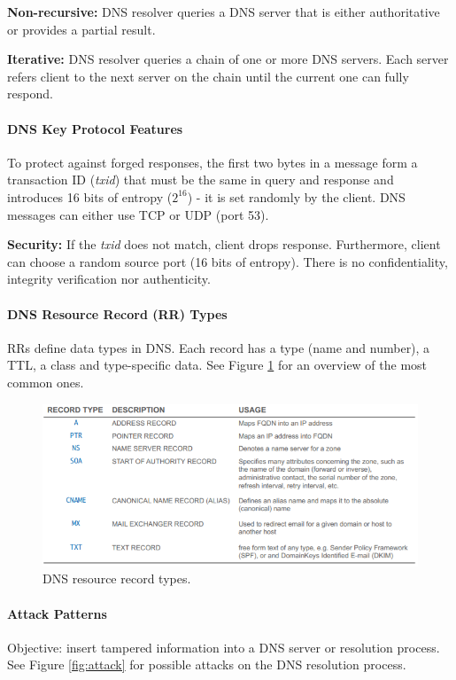 \textbf{Non-recursive:} DNS resolver queries a DNS server that is either authoritative or provides a partial result.

\textbf{Iterative:} DNS resolver queries a chain of one or more DNS servers. Each server refers client to the next server on the chain until the current one can fully respond.

\paragraph{DNS Key Protocol Features}
To protect against forged responses, the first two bytes in a message form a transaction ID (\textit{txid}) that must be the same in query and response and introduces 16 bits of entropy ($2^{16}$) - it is set randomly by the client. DNS messages can either use TCP or UDP (port 53).

\textbf{Security:} If the \textit{txid} does not match, client drops response. Furthermore, client can choose a random source port (16 bits of entropy). There is no confidentiality, integrity verification nor authenticity.

\paragraph{DNS Resource Record (RR) Types}
RRs define data types in DNS. Each record has a type (name and number), a TTL, a class and type-specific data. See Figure \ref{fig:rr} for an overview of the most common ones.

\begin{figure}[h]
	\centering
	\includegraphics[scale=0.8]{images/915-rr.PNG}
	\caption{DNS resource record types.}
	\label{fig:rr}
\end{figure}

\paragraph{Attack Patterns}
Objective: insert tampered information into a DNS server or resolution process. See Figure \ref{fig:attack} for possible attacks on the DNS resolution process.

